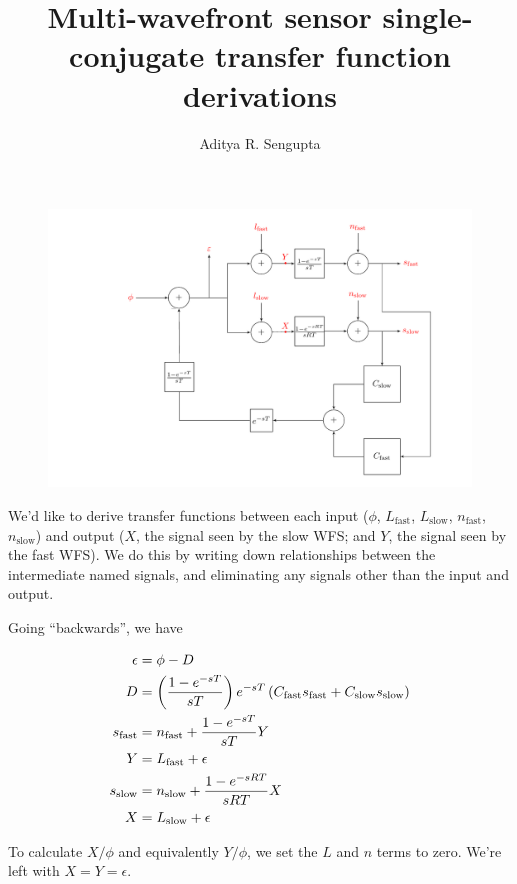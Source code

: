 \documentclass{article}
\title{Multi-wavefront sensor single-conjugate transfer function derivations}
\author{Aditya R. Sengupta}
\begin{document}
    \maketitle
    \begin{figure}[h]
        \includegraphics[width=\textwidth]{blockdiag_full_s.pdf}
    \end{figure}

    We'd like to derive transfer functions between each input ($\phi$, $L_{\text{fast}}$, $L_{\text{slow}}$, $n_{\text{fast}}$, $n_{\text{slow}}$) and output ($X$, the signal seen by the slow WFS; and $Y$, the signal seen by the fast WFS). We do this by writing down relationships between the intermediate named signals, and eliminating any signals other than the input and output.

    Going ``backwards'', we have

    \begin{align*}
        \epsilon &= \phi - D \\
        D &= \left(\frac{1 - e^{-sT}}{sT}\right) e^{-sT} \left(C_{\text{fast}} s_{\text{fast}} + C_{\text{slow}} s_{\text{slow}}\right) \\
        s_{\text{fast}} &= n_{\text{fast}} + \frac{1 - e^{-sT}}{sT} Y \\
        Y &= L_{\text{fast}} + \epsilon \\
        s_{\text{slow}} &= n_{\text{slow}} + \frac{1 - e^{-sRT}}{sRT} X \\
        X &= L_{\text{slow}} + \epsilon \\
    \end{align*}

    To calculate $X/\phi$ and equivalently $Y/\phi$, we set the $L$ and $n$ terms to zero. We're left with $X = Y = \epsilon$.
\end{document}
